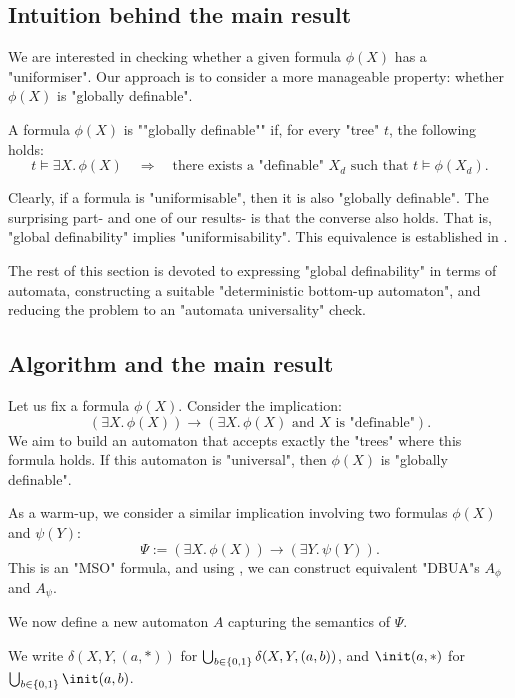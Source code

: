\documentclass[a4paper,UKenglish,cleveref, autoref, thm-restate]{lipics-v2021}
\begin{document}
\subsection{Intuition behind the main result}

We are interested in checking whether a given formula $\phi(X)$ has a "uniformiser".
Our approach is to consider a more manageable property: whether $\phi(X)$ is "globally definable".

\begin{definition}\label{def:global-def}
	\AP A formula $\phi(X)$ is ""globally definable"" if, for every "tree" $t$, the following holds:
	\[
		t \models \exists X.\, \phi(X) \quad \Rightarrow \quad \text{there exists a "definable" } X_d \text{ such that } t \models \phi(X_d).
	\]
\end{definition}

Clearly, if a formula is "uniformisable", then it is also "globally definable". The surprising part- and one of our results- is that the converse also holds.
That is, "global definability" implies "uniformisability". This equivalence is established in .

The rest of this section is devoted to expressing "global definability" in terms of automata, constructing a suitable "deterministic bottom-up automaton",
and reducing the problem to an "automata universality" check.

\subsection{Algorithm and the main result}

Let us fix a formula $\phi(X)$. Consider the implication:
\[
	(\exists X.\, \phi(X)) \rightarrow (\exists X.\, \phi(X) \text{ and $X$ is "definable"}).
\]
We aim to build an automaton that accepts exactly the "trees" where this formula holds. If this automaton is "universal", then $\phi(X)$ is "globally definable".

As a warm-up, we consider a similar implication involving two formulas $\phi(X)$ and $\psi(Y)$:
\[
	\Psi := (\exists X.\, \phi(X)) \rightarrow (\exists Y.\, \psi(Y)).
\]
This is an "MSO" formula, and using , we can construct equivalent "DBUA"s $A_\phi$ and $A_\psi$.

We now define a new automaton $A$ capturing the semantics of $\Psi$.

\begin{notation}
	We write $\delta(X,Y,(a,*))$ for $\bigcup_{b \in \left\{0,1\right\}} \delta(X,Y,(a,b))$, and $\init(a,*)$ for $\bigcup_{b \in \set{0,1}} \init(a,b)$.
\end{notation}
\end{document}
